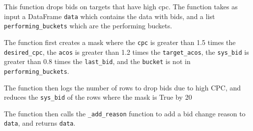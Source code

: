 This function drops bids on targets that have high cpc. The function takes as input a DataFrame \verb|data| which contains the data with bids, and a list \verb|performing_buckets| which are the performing buckets.

The function first creates a mask where the \verb|cpc| is greater than 1.5 times the \verb|desired_cpc|, the \verb|acos| is greater than 1.2 times the \verb|target_acos|, the \verb|sys_bid| is greater than 0.8 times the \verb|last_bid|, and the \verb|bucket| is not in \verb|performing_buckets|.

The function then logs the number of rows to drop bids due to high CPC, and reduces the \verb|sys_bid| of the rows where the mask is True by 20%

The function then calls the \verb|_add_reason| function to add a bid change reason to \verb|data|, and returns \verb|data|.